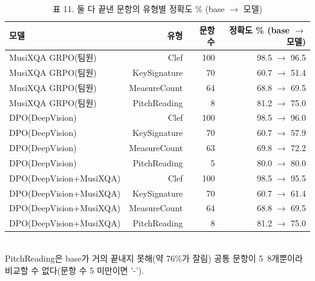 \begin{table}[t]
\centering
\small
\caption{표 11. 둘 다 끝낸 문항의 유형별 정확도 \% (base $\to$ 모델)}
\label{tab:table11_holdout_same_questions_by_type}
\begin{tabular}{lrrr}
\toprule
모델 & 유형 & 문항 수 & 정확도 \% (base $\to$ 모델) \\
\midrule
MusiXQA GRPO(팀원) & Clef & 100 & 98.5 $\to$ 96.5 \\
MusiXQA GRPO(팀원) & KeySignature & 70 & 60.7 $\to$ 51.4 \\
MusiXQA GRPO(팀원) & MeasureCount & 64 & 68.8 $\to$ 69.5 \\
MusiXQA GRPO(팀원) & PitchReading & 8 & 81.2 $\to$ 75.0 \\
DPO(DeepVision) & Clef & 100 & 98.5 $\to$ 96.0 \\
DPO(DeepVision) & KeySignature & 70 & 60.7 $\to$ 57.9 \\
DPO(DeepVision) & MeasureCount & 63 & 69.8 $\to$ 72.2 \\
DPO(DeepVision) & PitchReading & 5 & 80.0 $\to$ 80.0 \\
DPO(DeepVision+MusiXQA) & Clef & 100 & 98.5 $\to$ 95.5 \\
DPO(DeepVision+MusiXQA) & KeySignature & 70 & 60.7 $\to$ 61.4 \\
DPO(DeepVision+MusiXQA) & MeasureCount & 64 & 68.8 $\to$ 69.5 \\
DPO(DeepVision+MusiXQA) & PitchReading & 8 & 81.2 $\to$ 75.0 \\
\bottomrule
\end{tabular}
\\[2pt]{\footnotesize PitchReading은 base가 거의 끝내지 못해(약 76\%가 잘림) 공통 문항이 5~8개뿐이라 비교할 수 없다(문항 수 5 미만이면 '-').}
\end{table}
